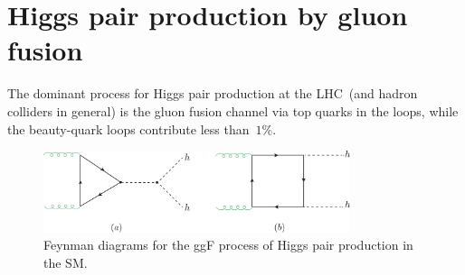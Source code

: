 \section{Higgs pair production by gluon fusion \label{ggFhh}  }
The dominant process for Higgs pair production at the LHC~(and hadron colliders in general) is the gluon fusion channel via top quarks in the loops, while the beauty-quark loops contribute less than~$1\%$.
%
\begin{figure}[!htpb]
	\centering
	\includegraphics[width = 0.8\textwidth]{./figures/di-higgs-LO-SM}
	\caption{Feynman diagrams for the ggF process of Higgs pair production in the SM.} 
	\label{fig_ggf_sm}
\end{figure}
%
